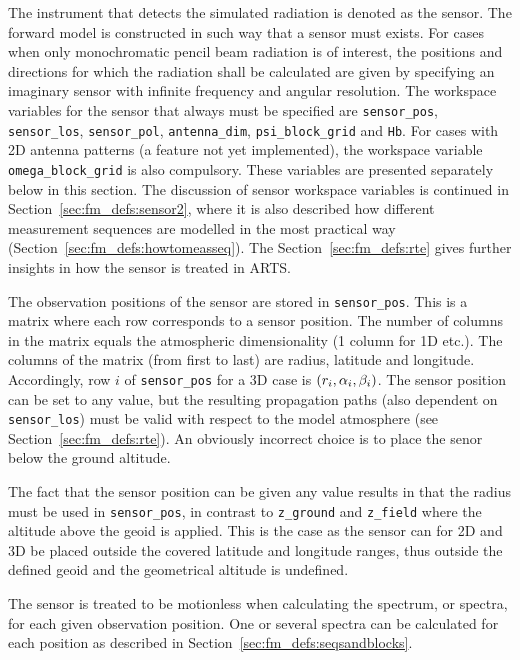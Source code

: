 The instrument that detects the simulated radiation is denoted as the
sensor. The forward model is constructed in such
way that a sensor must exists. For cases when only monochromatic
pencil beam radiation is of interest, the positions and directions for
which the radiation shall be calculated are given by specifying an
imaginary sensor with infinite frequency and angular resolution. The
workspace variables for the sensor that always must be specified are
\verb|sensor_pos|, \verb|sensor_los|, \verb|sensor_pol|,
\verb|antenna_dim|, \verb|psi_block_grid| and \verb|Hb|. For cases
with 2D antenna patterns (a feature not yet implemented), the
workspace variable \verb|omega_block_grid| is also compulsory.  These
variables are presented separately below in this section.  The
discussion of sensor workspace variables is continued in
Section~\ref{sec:fm_defs:sensor2}, where it is also described how
different measurement sequences are modelled in the most practical way
(Section~\ref{sec:fm_defs:howtomeasseq}). The
Section~\ref{sec:fm_defs:rte} gives further insights in how the sensor
is treated in ARTS.


\label{sec:fm_defs:sensorpos}

The observation positions of the sensor are stored in
\verb|sensor_pos|. This is a matrix where each row corresponds to a
sensor position. The number of columns in the matrix equals the
atmospheric dimensionality (1 column for 1D etc.). The columns of the
matrix (from first to last) are radius, latitude and longitude. 
Accordingly, row $i$ of \verb|sensor_pos| for a 3D case is
$(r_{i},\alpha_{i},\beta_{i})$. The sensor position can be set to any
value, but the resulting propagation paths (also dependent on
\verb|sensor_los|) must be valid with respect to the model atmosphere
(see Section~\ref{sec:fm_defs:rte}). An obviously incorrect choice is to
place the senor below the ground altitude.

The fact that the sensor position can be given any value results in
that the radius must be used in \verb|sensor_pos|, in contrast to
\verb|z_ground| and \verb|z_field| where the altitude above the geoid
is applied. This is the case as the sensor can for 2D and 3D be
placed outside the covered latitude and longitude ranges, thus
outside the defined geoid and the geometrical altitude is undefined.

The sensor is treated to be motionless when calculating the spectrum,
or spectra, for each given observation position. One or several
spectra can be calculated for each position as described in
Section~\ref{sec:fm_defs:seqsandblocks}.


